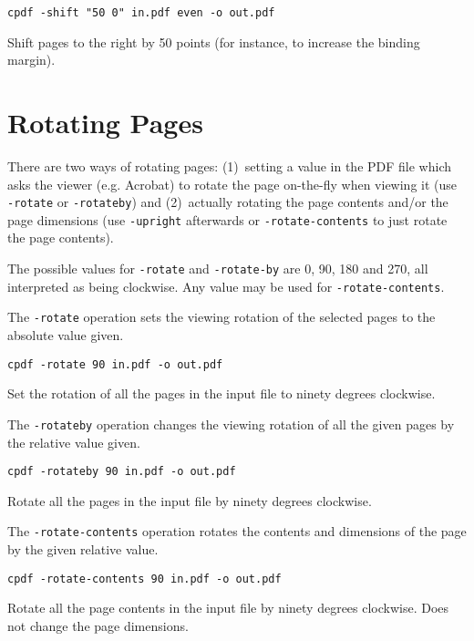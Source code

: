 \documentclass{book}
\begin{document}
  \begin{framed}
  \small\noindent\verb!cpdf -shift "50 0" in.pdf even -o out.pdf!

  \vspace{2.5mm}

  \noindent Shift pages to the right by 50 points (for instance, to increase
the binding margin).

  \end{framed}
  \section{Rotating Pages}

There are two ways of rotating pages: (1)~setting a value in the PDF file which
asks the viewer (e.g. Acrobat) to rotate the page on-the-fly when viewing it
(use \texttt{-rotate} or \texttt{-rotateby}) and (2)~actually rotating the page
contents and/or the page dimensions (use \texttt{-upright} afterwards or
\texttt{-rotate-contents} to just rotate the page contents).

  The possible values for \texttt{-rotate} and \texttt{-rotate-by} are 0, 90,
180 and 270, all interpreted as being clockwise. Any value may be used for
\texttt{-rotate-contents}.
  
The \texttt{-rotate} operation sets the viewing rotation of the selected pages to
the absolute value given.
  \begin{framed}
  \small\verb!cpdf -rotate 90 in.pdf -o out.pdf!

  \vspace{2.5mm}
  \noindent Set the rotation of all the pages in the input file to ninety degrees clockwise.
  \end{framed}
  \noindent The \texttt{-rotateby} operation changes the viewing rotation of all the
given pages by the relative value given.
  \begin{framed}
  \small\verb!cpdf -rotateby 90 in.pdf -o out.pdf!

  \vspace{2.5mm}
  \noindent Rotate all the pages in the input file by ninety degrees clockwise.
  \end{framed}
  \noindent The \texttt{-rotate-contents} operation rotates the contents and dimensions
of the page by the given relative value.
  \begin{framed}
  \small\verb!cpdf -rotate-contents 90 in.pdf -o out.pdf!

  \vspace{2.5mm}

  \noindent Rotate all the page contents in the input file by
ninety degrees clockwise. Does not change the page dimensions.
  \end{framed}
\end{document}
